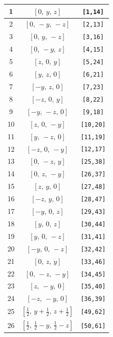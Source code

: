 \documentclass[fleqn,8pt]{jsarticle}
\begin{document}
\begin{longtable}{ccc}
1 & $\left[ 0,\, y,\, z \right]$ & {\tt [1,14]} \\ \hline
2 & $\left[ 0,\, - y,\, - z \right]$ & {\tt [2,13]} \\ \hline
3 & $\left[ 0,\, y,\, - z \right]$ & {\tt [3,16]} \\ \hline
4 & $\left[ 0,\, - y,\, z \right]$ & {\tt [4,15]} \\ \hline
5 & $\left[ z,\, 0,\, y \right]$ & {\tt [5,24]} \\ \hline
6 & $\left[ y,\, z,\, 0 \right]$ & {\tt [6,21]} \\ \hline
7 & $\left[ - y,\, z,\, 0 \right]$ & {\tt [7,23]} \\ \hline
8 & $\left[ - z,\, 0,\, y \right]$ & {\tt [8,22]} \\ \hline
9 & $\left[ - y,\, - z,\, 0 \right]$ & {\tt [9,18]} \\ \hline
10 & $\left[ z,\, 0,\, - y \right]$ & {\tt [10,20]} \\ \hline
11 & $\left[ y,\, - z,\, 0 \right]$ & {\tt [11,19]} \\ \hline
12 & $\left[ - z,\, 0,\, - y \right]$ & {\tt [12,17]} \\ \hline
13 & $\left[ 0,\, - z,\, y \right]$ & {\tt [25,38]} \\ \hline
14 & $\left[ 0,\, z,\, - y \right]$ & {\tt [26,37]} \\ \hline
15 & $\left[ z,\, y,\, 0 \right]$ & {\tt [27,48]} \\ \hline
16 & $\left[ - z,\, y,\, 0 \right]$ & {\tt [28,47]} \\ \hline
17 & $\left[ - y,\, 0,\, z \right]$ & {\tt [29,43]} \\ \hline
18 & $\left[ y,\, 0,\, z \right]$ & {\tt [30,44]} \\ \hline
19 & $\left[ y,\, 0,\, - z \right]$ & {\tt [31,41]} \\ \hline
20 & $\left[ - y,\, 0,\, - z \right]$ & {\tt [32,42]} \\ \hline
21 & $\left[ 0,\, z,\, y \right]$ & {\tt [33,46]} \\ \hline
22 & $\left[ 0,\, - z,\, - y \right]$ & {\tt [34,45]} \\ \hline
23 & $\left[ z,\, - y,\, 0 \right]$ & {\tt [35,40]} \\ \hline
24 & $\left[ - z,\, - y,\, 0 \right]$ & {\tt [36,39]} \\ \hline
25 & $\left[ \frac{1}{2},\, y + \frac{1}{2},\, z + \frac{1}{2} \right]$ & {\tt [49,62]} \\ \hline
26 & $\left[ \frac{1}{2},\, \frac{1}{2} - y,\, \frac{1}{2} - z \right]$ & {\tt [50,61]} \\ \hline

\end{longtable}
\end{document}
